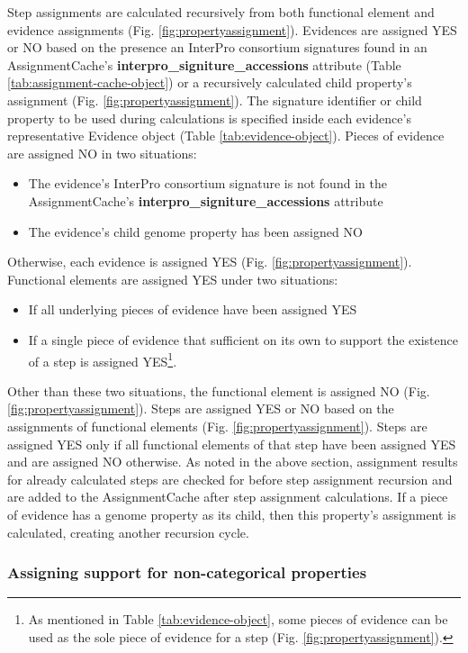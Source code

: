 Step assignments are calculated recursively from both functional element and evidence assignments (Fig. \ref{fig:propertyassignment}). Evidences are assigned YES or NO based on the presence an InterPro consortium signatures found in an AssignmentCache's \textbf{interpro\_signiture\_accessions} attribute (Table \ref{tab:assignment-cache-object}) or a recursively calculated child property's assignment (Fig. \ref{fig:propertyassignment}). The signature identifier or child property to be used during calculations is specified inside each evidence's representative Evidence object (Table \ref{tab:evidence-object}). Pieces of evidence are assigned NO in two situations: 

\begin{itemize}
\item The evidence's InterPro consortium signature is not found in the AssignmentCache's \textbf{interpro\_signiture\_accessions} attribute 
\item The evidence's child genome property has been assigned NO 
\end{itemize}
Otherwise, each evidence is assigned YES (Fig. \ref{fig:propertyassignment}). Functional elements are assigned YES under two situations: 

\begin{itemize}
\item If all underlying pieces of evidence have been assigned YES
\item If a single piece of evidence that sufficient on its own to support the existence of a step is assigned YES\footnote{As mentioned in Table \ref{tab:evidence-object}, some pieces of evidence can be used as the sole piece of evidence for a step (Fig. \ref{fig:propertyassignment}).}.
\end{itemize}

Other than these two situations, the functional element is assigned NO (Fig. \ref{fig:propertyassignment}). Steps are assigned YES or NO based on the assignments of functional elements (Fig. \ref{fig:propertyassignment}). Steps are assigned YES only if all functional elements of that step have been assigned YES and are assigned NO otherwise. As noted in the above section, assignment results for already calculated steps are checked for before step assignment recursion and are added to the AssignmentCache after step assignment calculations. If a piece of evidence has a genome property as its child, then this property's assignment is calculated, creating another recursion cycle.

\subsubsection{Assigning support for non-categorical properties}

